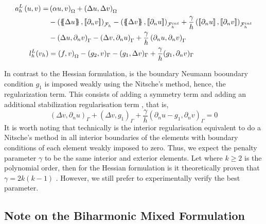 \begin{equation}
    \begin{split}
        a_{h}^{L} \left( u, v \right)   =&
        \left( \alpha  u, v \right) _{\Omega }   +  \left( \Delta  u, \Delta v \right) _{ \Omega } \\
                                         & - \left( \mean{  \Delta  u }, \jump{ \partial _{n }v} \right)_{\mathcal{F}_{h}  }  - \left( \mean{ \Delta  v }, \jump{ \partial _{n}u }      \right)_{\mathcal{F}_{h}^{int}  }  + \frac{\gamma }{h}  \left( \jump{ \partial _{n} u}, \jump{ \partial _{n} v   }   \right)_{\mathcal{F}_{h}^{int} } \\
                                         & - \left(   \Delta  u ,  \partial _{n }v \right)_{\Gamma   }  - \left(  \Delta  v ,  \partial _{n}u       \right)_{\Gamma  }  + \frac{\gamma }{h}  \left(  \partial _{n} u,  \partial _{n} v      \right)_{ \Gamma } \\
        l^{L}_{h}( v_{h}) & =  \left( f, v \right) _{\Omega } - ( g_{2},  v )_{\Gamma } -  ( g_{1}, \Delta  v  )_{\Gamma }  + \frac{\gamma }{h} ( g_{1}, \partial _{n} v  )_{\Gamma }
    \end{split}
\end{equation}


In contrast to the Hessian formulation, is the boundary Neumann booundary condition $g_{1}$ is imposed weakly using the Nitsche's method, hence, the regularization term.
This consists of adding a symmetry term and adding an additional stabilization regularisation term \cite{nitsche1971variationsprinzip}, that is,  \[
( \Delta  v,  \partial _{n}u    )_{\Gamma } +( \Delta
v,g_{1}     )_{\Gamma } + \frac{\gamma}{h}(\partial _{n}u -  g_{1}, \partial _{n}v     )_{\Gamma }   = 0
\]
It is worth noting that technically is the interior regularisation equivalent to do a Nitsche's method in all interior boundaries of the elements with boundary conditions of each element weakly
imposed to zero. Thus, we expect the penalty parameter $\gamma$ to be the same interior and exterior elements. Let where $k\ge 2$ is the polynomial order, then for the Hessian formulation is it theoretically proven that $\gamma = 2k ( k-1 ) $
\cite{brenner2012quadratic, brenner2012}. However, we still prefer to experimentally verify the best parameter.


\subsection{Note on the Biharmonic Mixed Formulation}%
\label{subsec:biharmonic_mixed_formulation}

